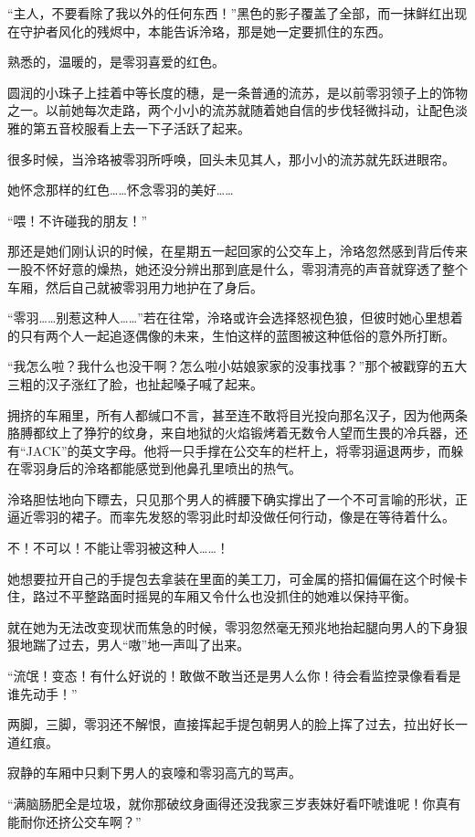 \documentclass[UTF8, scheme = chinese, openany]{ctexbook}
\begin{document}
“主人，不要看除了我以外的任何东西！”黑色的影子覆盖了全部，而一抹鲜红出现在守护者风化的残烬中，本能告诉泠珞，那是她一定要抓住的东西。

熟悉的，温暖的，是零羽喜爱的红色。

圆润的小珠子上挂着中等长度的穗，是一条普通的流苏，是以前零羽领子上的饰物之一。以前她每次走路，两个小小的流苏就随着她自信的步伐轻微抖动，让配色淡雅的第五音校服看上去一下子活跃了起来。

很多时候，当泠珞被零羽所呼唤，回头未见其人，那小小的流苏就先跃进眼帘。

她怀念那样的红色……怀念零羽的美好……

“喂！不许碰我的朋友！”

那还是她们刚认识的时候，在星期五一起回家的公交车上，泠珞忽然感到背后传来一股不怀好意的燥热，她还没分辨出那到底是什么，零羽清亮的声音就穿透了整个车厢，然后自己就被零羽用力地护在了身后。

“零羽……别惹这种人……”若在往常，泠珞或许会选择怒视色狼，但彼时她心里想着的只有两个人一起追逐偶像的未来，生怕这样的蓝图被这种低俗的意外所打断。

“我怎么啦？我什么也没干啊？怎么啦小姑娘家家的没事找事？”那个被戳穿的五大三粗的汉子涨红了脸，也扯起嗓子喊了起来。

拥挤的车厢里，所有人都缄口不言，甚至连不敢将目光投向那名汉子，因为他两条胳膊都纹上了狰狞的纹身，来自地狱的火焰锻烤着无数令人望而生畏的冷兵器，还有“JACK”的英文字母。他将一只手撑在公交车的栏杆上，将零羽逼退两步，而躲在零羽身后的泠珞都能感觉到他鼻孔里喷出的热气。

泠珞胆怯地向下瞟去，只见那个男人的裤腰下确实撑出了一个不可言喻的形状，正逼近零羽的裙子。而率先发怒的零羽此时却没做任何行动，像是在等待着什么。

不！不可以！不能让零羽被这种人……！

她想要拉开自己的手提包去拿装在里面的美工刀，可金属的搭扣偏偏在这个时候卡住，路过不平整路面时摇晃的车厢又令什么也没抓住的她难以保持平衡。

就在她为无法改变现状而焦急的时候，零羽忽然毫无预兆地抬起腿向男人的下身狠狠地踹了过去，男人“嗷”地一声叫了出来。

“流氓！变态！有什么好说的！敢做不敢当还是男人么你！待会看监控录像看看是谁先动手！”

两脚，三脚，零羽还不解恨，直接挥起手提包朝男人的脸上挥了过去，拉出好长一道红痕。

寂静的车厢中只剩下男人的哀嚎和零羽高亢的骂声。

“满脑肠肥全是垃圾，就你那破纹身画得还没我家三岁表妹好看吓唬谁呢！你真有能耐你还挤公交车啊？”
\end{document}

